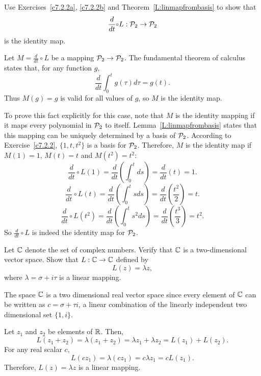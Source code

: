 \documentclass{ximera}
\begin{document}
\begin{exercise}  \label{c7.2.2c}
Use Exercises~\ref{c7.2.2a}, \ref{c7.2.2b} and
Theorem~\ref{L:linmapfrombasis} to show that
\[
\frac{d}{dt}\compose L:{\cal P}_2\to{\cal P}_2
\]
is the identity map.

\begin{solution}

Let $M = \frac{d}{dt} \circ L$ be a mapping ${\cal P}_2
\rightarrow {\cal P}_2$.  The fundamental
theorem of calculus states that, for any function $g$,
\[ \frac{d}{dt}\int_0^t g(\tau)d\tau = g(t). \]
Thus $M(g) = g$ is valid for all values of $g$, so $M$ is the
identity map.

\para To prove this fact explicitly for this case, note that $M$ is
the identity mapping if it maps every polynomial in ${\cal P}_2$ to
itself.  Lemma~\ref{L:linmapfrombasis} states that this mapping can
be uniquely determined by a basis of ${\cal P}_2$.  According to
Exercise~\ref{c7.2.2}, $\{1,t,t^2\}$ is a basis for ${\cal P}_2$. 
Therefore, $M$ is the identity map if $M(1) = 1$, $M(t) = t$ and
$M(t^2) = t^2$:
\[ \frac{d}{dt} \circ L (1) = \frac{d}{dt}\left(\int_0^tds\right) =
\frac{d}{dt}(t) = 1. \]
\[ \frac{d}{dt} \circ L (t) = \frac{d}{dt}\left(\int_0^tsds\right) =
\frac{d}{dt}\left(\frac{t^2}{2}\right) = t. \]
\[ \frac{d}{dt} \circ L (t^2) = \frac{d}{dt}\left(\int_0^ts^2ds\right) =
\frac{d}{dt}\left(\frac{t^3}{3}\right) = t^2. \]
So $\frac{d}{dt} \circ L$ is indeed the identity map for ${\cal P}_2$.

\end{solution}
\end{exercise}

\begin{exercise} \label{c7.2.3}
Let $\mbox{$\Bbb{C}$}$ denote the set of complex numbers.  Verify that
$\mbox{$\Bbb{C}$}$ is a two-dimensional vector space.  Show that $L:\mbox{$\Bbb{C}$}\to\mbox{$\Bbb{C}$}$
defined by
\[
L(z) = \lambda z,
\]
where $\lambda=\sigma+i\tau$ is a linear mapping.

\begin{solution}

The space $\mbox{$\Bbb{C}$}$ is a two dimensional real vector space since every
element of $\mbox{$\Bbb{C}$}$ can be written as $c = \sigma + \tau i$, a linear
combination of the linearly independent two dimensional set $\{1,i\}$.

\para Let $z_1$ and $z_2$ be elements of $\mbox{$\Bbb{R}$}$.  Then,
\[ L(z_1 + z_2) = \lambda(z_1 + z_2) =
\lambda z_1 + \lambda z_2 = L(z_1) + L(z_2). \]
For any real scalar $c$,
\[ L(cz_1) = \lambda(cz_1) = 
c\lambda z_1 = cL(z_1). \]
Therefore, $L(z) = \lambda z$ is a linear mapping.


\end{solution}
\end{exercise}
\end{document}
